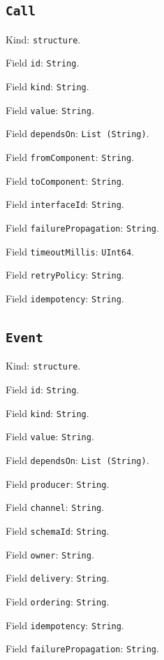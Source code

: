 \documentclass[11pt]{article}
\begin{document}
\subsection*{\texttt{Call}}
\noindent Kind: \texttt{structure}.\par
\noindent Field \texttt{id}: \texttt{String}.\par
\noindent Field \texttt{kind}: \texttt{String}.\par
\noindent Field \texttt{value}: \texttt{String}.\par
\noindent Field \texttt{dependsOn}: \texttt{List (String)}.\par
\noindent Field \texttt{fromComponent}: \texttt{String}.\par
\noindent Field \texttt{toComponent}: \texttt{String}.\par
\noindent Field \texttt{interfaceId}: \texttt{String}.\par
\noindent Field \texttt{failurePropagation}: \texttt{String}.\par
\noindent Field \texttt{timeoutMillis}: \texttt{UInt64}.\par
\noindent Field \texttt{retryPolicy}: \texttt{String}.\par
\noindent Field \texttt{idempotency}: \texttt{String}.\par
\subsection*{\texttt{Event}}
\noindent Kind: \texttt{structure}.\par
\noindent Field \texttt{id}: \texttt{String}.\par
\noindent Field \texttt{kind}: \texttt{String}.\par
\noindent Field \texttt{value}: \texttt{String}.\par
\noindent Field \texttt{dependsOn}: \texttt{List (String)}.\par
\noindent Field \texttt{producer}: \texttt{String}.\par
\noindent Field \texttt{channel}: \texttt{String}.\par
\noindent Field \texttt{schemaId}: \texttt{String}.\par
\noindent Field \texttt{owner}: \texttt{String}.\par
\noindent Field \texttt{delivery}: \texttt{String}.\par
\noindent Field \texttt{ordering}: \texttt{String}.\par
\noindent Field \texttt{idempotency}: \texttt{String}.\par
\noindent Field \texttt{failurePropagation}: \texttt{String}.\par
\end{document}
